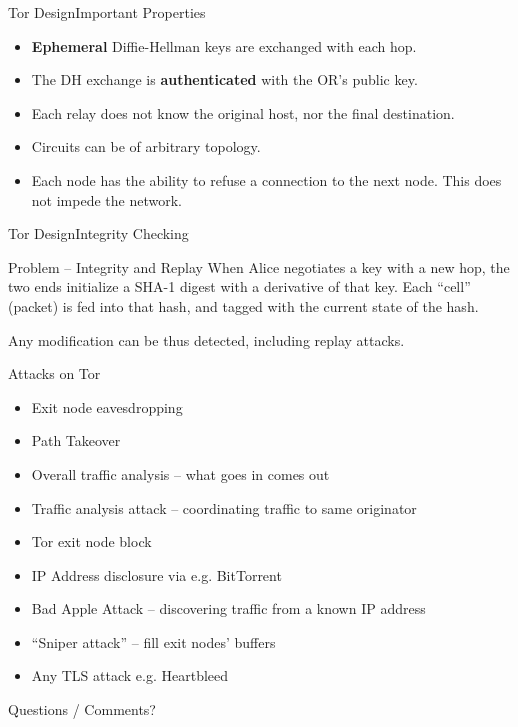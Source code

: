 \documentclass[12pt]{beamer}
\begin{document}
\begin{frame}{Tor Design}{Important Properties}
	\begin{itemize}
		\item \textbf{Ephemeral} Diffie-Hellman keys are exchanged with each
			hop.
		\item The DH exchange is \textbf{authenticated} with the OR's public
			key.
		\item Each relay does not know the original host, nor the final
			destination.
		\item Circuits can be of arbitrary topology.
		\item Each node has the ability to refuse a connection to the next node.
			This does not impede the network.
	\end{itemize}
\end{frame}

\begin{frame}{Tor Design}{Integrity Checking}
	\begin{block}{Problem -- Integrity and Replay}
		When Alice negotiates a key with a new hop, the two ends initialize a
		SHA-1 digest with a derivative of that key. Each ``cell'' (packet) is
		fed into that hash, and tagged with the current state of the hash.

		Any modification can be thus detected, including replay attacks.
	\end{block}
\end{frame}

\begin{frame}{Attacks on Tor}
	\begin{itemize}[<+->]
		\item Exit node eavesdropping
		\item Path Takeover
		\item Overall traffic analysis -- what goes in comes out
		\item Traffic analysis attack -- coordinating traffic to same originator
		\item Tor exit node block
		\item IP Address disclosure via e.g. BitTorrent
		\item Bad Apple Attack -- discovering traffic from a known IP address
		\item ``Sniper attack'' -- fill exit nodes' buffers
		\item Any TLS attack e.g. Heartbleed
	\end{itemize}
\end{frame}

\begin{frame}{Questions / Comments?}
\end{frame}
\end{document}
